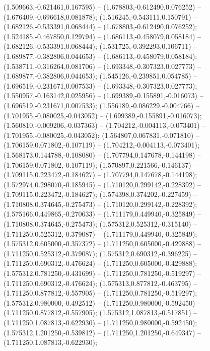  (1.509663,-0.621461,0.167595) -- (1.678803,-0.612490,0.076252) -- (1.676409,-0.696618,0.081878);
 (1.516245,-0.543111,0.150791) -- (1.682126,-0.533391,0.068444) -- (1.678803,-0.612490,0.076252);
 (1.524185,-0.467850,0.129794) -- (1.686113,-0.458079,0.058184) -- (1.682126,-0.533391,0.068444);
 (1.531725,-0.392293,0.106711) -- (1.689877,-0.382806,0.044653) -- (1.686113,-0.458079,0.058184);
 (1.538711,-0.316264,0.081706) -- (1.693348,-0.307323,0.027773) -- (1.689877,-0.382806,0.044653);
 (1.545126,-0.239851,0.054785) -- (1.696519,-0.231671,0.007533) -- (1.693348,-0.307323,0.027773);
 (1.550957,-0.163142,0.025956) -- (1.699389,-0.155891,-0.016073) -- (1.696519,-0.231671,0.007533);
 (1.556189,-0.086229,-0.004766) -- (1.701955,-0.080025,-0.043052) -- (1.699389,-0.155891,-0.016073);
 (1.560810,-0.009206,-0.037363) -- (1.704212,-0.004113,-0.073401) -- (1.701955,-0.080025,-0.043052);
 (1.564807,0.067831,-0.071810) -- (1.706159,0.071802,-0.107119) -- (1.704212,-0.004113,-0.073401);
 (1.568173,0.144788,-0.108080) -- (1.707794,0.147678,-0.144198) -- (1.706159,0.071802,-0.107119);
 (1.570897,0.221566,-0.146137) -- (1.709115,0.223472,-0.184627) -- (1.707794,0.147678,-0.144198);
 (1.572974,0.298070,-0.185945) -- (1.710120,0.299142,-0.228392) -- (1.709115,0.223472,-0.184627);
 (1.574398,0.374202,-0.227459) -- (1.710808,0.374645,-0.275473) -- (1.710120,0.299142,-0.228392);
 (1.575166,0.449865,-0.270633) -- (1.711179,0.449940,-0.325849) -- (1.710808,0.374645,-0.275473);
 (1.575312,0.525312,-0.315140) -- (1.711250,0.525312,-0.379087) -- (1.711179,0.449940,-0.325849);
 (1.575312,0.605000,-0.357372) -- (1.711250,0.605000,-0.429888) -- (1.711250,0.525312,-0.379087);
 (1.575312,0.690312,-0.396225) -- (1.711250,0.690312,-0.476624) -- (1.711250,0.605000,-0.429888);
 (1.575312,0.781250,-0.431699) -- (1.711250,0.781250,-0.519297) -- (1.711250,0.690312,-0.476624);
 (1.575313,0.877812,-0.463795) -- (1.711250,0.877812,-0.557905) -- (1.711250,0.781250,-0.519297);
 (1.575312,0.980000,-0.492512) -- (1.711250,0.980000,-0.592450) -- (1.711250,0.877812,-0.557905);
 (1.575312,1.087813,-0.517851) -- (1.711250,1.087813,-0.622930) -- (1.711250,0.980000,-0.592450);
 (1.575312,1.201250,-0.539812) -- (1.711250,1.201250,-0.649347) -- (1.711250,1.087813,-0.622930);
